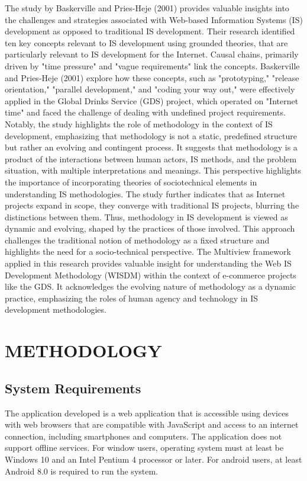 \documentclass{icsthesis}
\begin{document}
\begin{mainmatter}
The study by Baskerville and Pries-Heje (2001) provides valuable insights into the challenges and strategies associated with Web-based Information Systems (IS) development as opposed to traditional IS development. Their research identified ten key concepts relevant to IS development using grounded theories, that are particularly relevant to IS development for the Internet. Causal chains, primarily driven by "time pressure" and "vague requirements" link the concepts. Baskerville and Pries-Heje (2001) explore how these concepts, such as "prototyping," "release orientation," "parallel development," and "coding your way out," were effectively applied in the Global Drinks Service (GDS) project, which operated on "Internet time" and faced the challenge of dealing with undefined project requirements. Notably, the study highlights the role of methodology in the context of IS development, emphasizing that methodology is not a static, predefined structure but rather an evolving and contingent process. It suggests that methodology is a product of the interactions between human actors, IS methods, and the problem situation, with multiple interpretations and meanings. This perspective highlights the importance of incorporating theories of sociotechnical elements in understanding IS methodologies. The study further indicates that as Internet projects expand in scope, they converge with traditional IS projects, blurring the distinctions between them. Thus, methodology in IS development is viewed as dynamic and evolving, shaped by the practices of those involved. This approach challenges the traditional notion of methodology as a fixed structure and highlights the need for a socio-technical perspective. The Multiview framework applied in this research provides valuable insight for understanding the Web IS Development Methodology (WISDM) within the context of e-commerce projects like the GDS. It acknowledges the evolving nature of methodology as a dynamic practice, emphasizing the roles of human agency and technology in IS development methodologies. 


				
				
		
		\section{METHODOLOGY}
			\subsection{\textbf{System Requirements}}
The application developed is a web application that is accessible using devices with web browsers that are compatible with JavaScript and access to an internet connection, including smartphones and computers. The application does not support offline services. For window users, operating system must at least be Windows 10 and an Intel Pentium 4 processor or later. For android users, at least Android 8.0 is required to run the system.  

\end{mainmatter}
\end{document}
